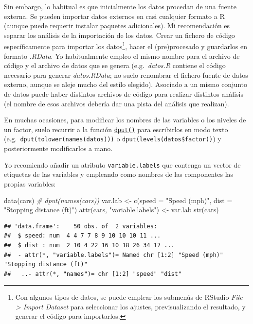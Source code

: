 \documentclass[
]{book}
\newenvironment{Shaded}{\begin{snugshade}}{\end{snugshade}}
\newcommand{\AttributeTok}[1]{\textcolor[rgb]{0.77,0.63,0.00}{#1}}
\newcommand{\CommentTok}[1]{\textcolor[rgb]{0.56,0.35,0.01}{\textit{#1}}}
\newcommand{\FunctionTok}[1]{\textcolor[rgb]{0.00,0.00,0.00}{#1}}
\newcommand{\NormalTok}[1]{#1}
\newcommand{\OtherTok}[1]{\textcolor[rgb]{0.56,0.35,0.01}{#1}}
\newcommand{\StringTok}[1]{\textcolor[rgb]{0.31,0.60,0.02}{#1}}
\theoremstyle{break}
\theoremstyle{nonumberplain}
\begin{document}
Sin embargo, lo habitual es que inicialmente los datos procedan de una fuente externa.
Se pueden importar datos externos en casi cualquier formato a R (aunque puede requerir instalar paquetes adicionales).
Mi recomendación es separar los análisis de la importación de los datos.
Crear un fichero de código específicamente para importar los datos\footnote{Con algunos tipos de datos, se puede emplear los submenús de RStudio \emph{File \textgreater{} Import Dataset} para seleccionar los ajustes, previsualizando el resultado, y generar el código para importarlos.}, hacer el (pre)procesado y guardarlos en formato \emph{.RData}.
Yo habitualmente empleo el mismo nombre para el archivo de código y el archivo de datos que se genera (e.g.~\emph{datos.R} contiene el código necesario para generar \emph{datos.RData}; no suelo renombrar el fichero fuente de datos externo, aunque se aleje mucho del estilo elegido).
Asociado a un mismo conjunto de datos puede haber distintos archivos de código para realizar distintos análisis (el nombre de esos archivos debería dar una pista del análisis que realizan).

En muchas ocasiones, para modificar los nombres de las variables o los niveles de un factor, suelo recurrir a la función \href{https://rdrr.io/r/base/dput.html}{\texttt{dput()}} para escribirlos en modo texto (e.g.~\texttt{dput(tolower(names(datos)))} o \texttt{dput(levels(datos\$factor))}) y posteriormente modificarlos a mano.

Yo recomiendo añadir un atributo \texttt{variable.labels} que contenga un vector de etiquetas de las variables y empleando como nombres de las componentes las propias variables:

\begin{Shaded}
\begin{Highlighting}[]
\FunctionTok{data}\NormalTok{(cars)}
\CommentTok{\# dput(names(cars))}
\NormalTok{var.lab }\OtherTok{\textless{}{-}} \FunctionTok{c}\NormalTok{(}\AttributeTok{speed =} \StringTok{"Speed (mph)"}\NormalTok{, }\AttributeTok{dist =} \StringTok{"Stopping distance (ft)"}\NormalTok{)}
\FunctionTok{attr}\NormalTok{(cars, }\StringTok{"variable.labels"}\NormalTok{) }\OtherTok{\textless{}{-}}\NormalTok{ var.lab}
\FunctionTok{str}\NormalTok{(cars)}
\end{Highlighting}
\end{Shaded}

\begin{verbatim}
## 'data.frame':    50 obs. of  2 variables:
##  $ speed: num  4 4 7 7 8 9 10 10 10 11 ...
##  $ dist : num  2 10 4 22 16 10 18 26 34 17 ...
##  - attr(*, "variable.labels")= Named chr [1:2] "Speed (mph)" "Stopping distance (ft)"
##   ..- attr(*, "names")= chr [1:2] "speed" "dist"
\end{verbatim}
\end{document}
